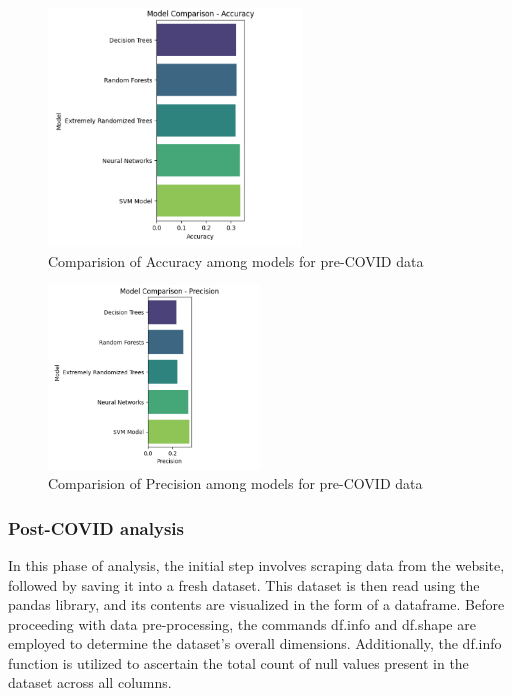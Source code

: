 \documentclass[12pt]{article}
\begin{document}
\newpage
\begin{figure}[ht]
    \centering
    \includegraphics[width = 0.6\textwidth]{Figures/Pre_covid_Accuracy.png}
    \caption{Comparision of Accuracy among models for pre-COVID data}
    \label{fig:Comparision of Accuracy among models for pre-COVID data}
\end{figure}

\bigbreak

\begin{figure}[ht]
    \centering
    \includegraphics[width = 0.5\textwidth]{Figures/Pre_covid_Precision.png}
    \caption{Comparision of Precision among models for pre-COVID data}
    \label{fig:Comparision of Precision among models for pre-COVID data}
\end{figure}

\newpage
\subsubsection{Post-COVID analysis}

In this phase of analysis, the initial step involves scraping data from the website, followed by saving it into a fresh dataset. This dataset is then read using the pandas library, and its contents are visualized in the form of a dataframe. Before proceeding with data pre-processing, the commands df.info and df.shape are employed to determine the dataset's overall dimensions. Additionally, the df.info function is utilized to ascertain the total count of null values present in the dataset across all columns.
\end{document}
